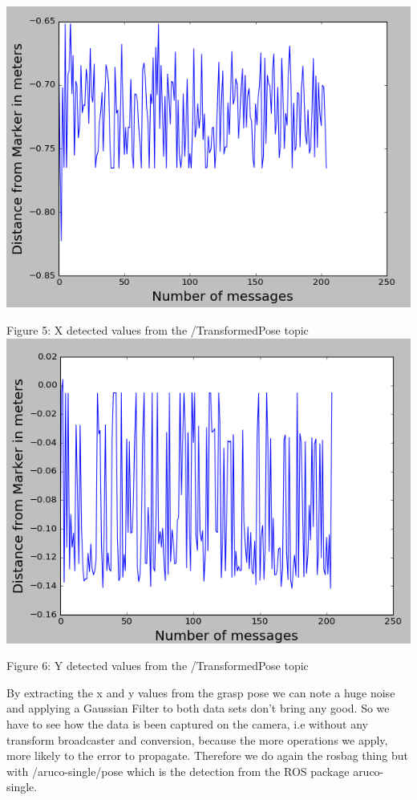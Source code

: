 \documentclass{article}
\begin{document}
\begin{center}
    \includegraphics[scale=0.5]{pictures/pic4.png}
    
    Figure 5: X detected values from the /TransformedPose topic
    \includegraphics[scale=0.5]{pictures/pic5.png}
    
    Figure 6: Y detected values from the /TransformedPose topic
\end{center}
By extracting the x and y values from the grasp pose we can note a huge noise and applying a Gaussian Filter to both data sets don't bring any good. So we have to see how the data is been captured on the camera, i.e without any transform broadcaster and conversion, because the more operations we apply, more likely to the error to propagate. Therefore we do again the rosbag thing but with /aruco-single/pose which is the detection from the ROS package aruco-single.
\end{document}
